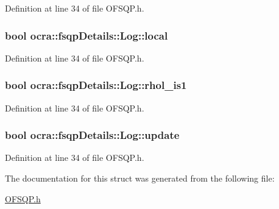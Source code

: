 Definition at line 34 of file O\+F\+S\+Q\+P.\+h.

\subsubsection[{\texorpdfstring{local}{local}}]{\setlength{\rightskip}{0pt plus 5cm}bool ocra\+::fsqp\+Details\+::\+Log\+::local}\hypertarget{structocra_1_1fsqpDetails_1_1Log_a17e784308319e498ceaf11b4b809df52}{}\label{structocra_1_1fsqpDetails_1_1Log_a17e784308319e498ceaf11b4b809df52}


Definition at line 34 of file O\+F\+S\+Q\+P.\+h.

\subsubsection[{\texorpdfstring{rhol\+\_\+is1}{rhol_is1}}]{\setlength{\rightskip}{0pt plus 5cm}bool ocra\+::fsqp\+Details\+::\+Log\+::rhol\+\_\+is1}\hypertarget{structocra_1_1fsqpDetails_1_1Log_a9538a5454c767ecb63620f4b36d72676}{}\label{structocra_1_1fsqpDetails_1_1Log_a9538a5454c767ecb63620f4b36d72676}


Definition at line 34 of file O\+F\+S\+Q\+P.\+h.

\subsubsection[{\texorpdfstring{update}{update}}]{\setlength{\rightskip}{0pt plus 5cm}bool ocra\+::fsqp\+Details\+::\+Log\+::update}\hypertarget{structocra_1_1fsqpDetails_1_1Log_abb57457b6ee98f85e51eff3b56797668}{}\label{structocra_1_1fsqpDetails_1_1Log_abb57457b6ee98f85e51eff3b56797668}


Definition at line 34 of file O\+F\+S\+Q\+P.\+h.



The documentation for this struct was generated from the following file\+:\begin{DoxyCompactItemize}
\item 
\hyperlink{OFSQP_8h}{O\+F\+S\+Q\+P.\+h}\end{DoxyCompactItemize}
